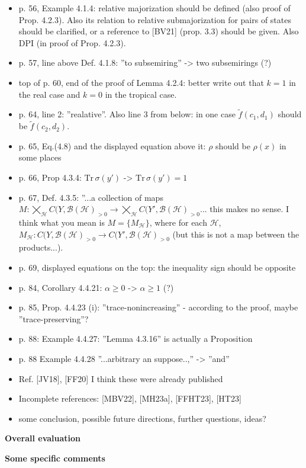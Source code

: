 \documentclass[12pt]{article}
\begin{document}
\begin{itemize}
\item p. 56, Example 4.1.4: relative majorization should be defined (also proof of Prop.
4.2.3). Also its relation to relative submajorization for pairs of states should be clarified, or a reference to [BV21]
(prop. 3.3) should be given. Also DPI (in proof of Prop. 4.2.3).

\item p. 57, line above Def. 4.1.8: ''to subsemiring'' -> two subsemirings (?)

\item top of p. 60, end of the proof of Lemma 4.2.4: better write out that $k=1$ in the
real case and $k=0$  in the tropical case.

\item p. 64, line 2: ''realative''. Also line 3 from below: in one case $\tilde
f(c_1,d_1)$ should be $\tilde f(c_2,d_2)$.

\item p. 65, Eq.(4.8) and the displayed equation above it: $\rho$ should be $\rho(x)$ in
some places

\item p. 66, Prop 4.3.4: $\mathrm{Tr}\, \sigma(y')$ -> $\mathrm{Tr}\, \sigma(y')=1$

\item p. 67, Def. 4.3.5: ''...a collection of maps $M:\bigtimes_{\mathcal H} C(Y,\mathcal
B(\mathcal H)_{>0}\to\bigtimes_{\mathcal H} C(Y',\mathcal
B(\mathcal H)_{>0} $... this makes no sense. I think what you mean is $M=\{M_{\mathcal
H}\}$, where for each $\mathcal H$, $M_{\mathcal H}: C(Y,\mathcal
B(\mathcal H)_{>0}\to C(Y',\mathcal
B(\mathcal H)_{>0}$ (but this is not a map between the products...).

\item p. 69, displayed equations on the top: the inequality sign should be opposite

\item p. 84, Corollary 4.4.21: $\alpha\ge 0$ -> $\alpha\ge 1$  (?)

\item p. 85, Prop. 4.4.23 (i): ''trace-nonincreasing'' - according to the proof, maybe
''trace-preserving''?

\item p. 88: Example 4.4.27: ''Lemma 4.3.16'' is actually a Proposition

\item p. 88 Example 4.4.28 ''...arbitrary an suppose..,'' -> ''and''

\item Ref. [JV18], [FF20] I think these were already published

\item Incomplete references: [MBV22], [MH23a], [FFHT23], [HT23]

\item some conclusion, possible future directions, further questions, ideas? 

\end{itemize}






\medskip

\noindent
\textbf{Overall evaluation}

\medskip
 

\medskip

\noindent
\textbf{Some specific comments}


\
\end{document}
